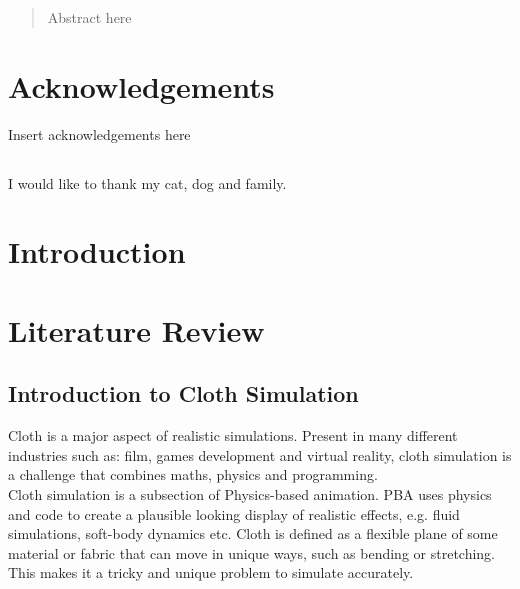 \documentclass[12pt,a4paper]{article}
\begin{document}


\pagebreak

\pagebreak

\begin{abstract}
Abstract here
\end{abstract}
\pagebreak

\tableofcontents %
\newpage

\listoftables
\newpage

\listoffigures
\newpage

\section*{Acknowledgements}
Insert acknowledgements here
\subsection*{}
	I would like to thank my cat, dog and family.
\newpage

\section{Introduction}
\newpage
\section{Literature Review}
\subsection{Introduction to Cloth Simulation}
Cloth is a major aspect of realistic simulations. Present in many different industries such as: film, games development and virtual reality, cloth simulation is a challenge that combines maths, physics and programming. \\

Cloth simulation is a subsection of Physics-based animation. PBA uses physics and code to create a plausible looking display of realistic effects, e.g. fluid simulations, soft-body dynamics etc. Cloth is defined as a flexible plane of some material or fabric that can move in unique ways, such as bending or stretching. This makes it a tricky and unique problem to simulate accurately. \\
\end{document}
